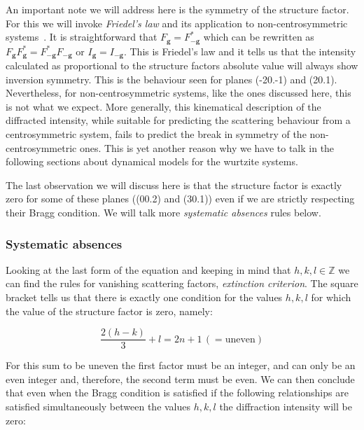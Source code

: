 An important note we will address here is the symmetry of the structure factor. For this we will invoke \textit{Friedel's law} and its application to non-centrosymmetric systems~\cite{Serneels73}. It is straightforward that $F_\mathbf{g}=F^*_{-\mathbf{g}}$ which can be rewritten as $F_\mathbf{g} F^*_\mathbf{g}=F^*_{-\mathbf{g}}F_{-\mathbf{g}}$ or $I_\mathbf{g}=I_\mathbf{-g}$. This is Friedel's law and it tells us that the intensity calculated as proportional to the structure factors absolute value will always show inversion symmetry. This is the behaviour seen for planes \hkl(-20.-1) and \hkl(20.1). Nevertheless, for non-centrosymmetric systems, like the ones discussed here, this is not what we expect. More generally, this kinematical description of the diffracted intensity, while suitable for predicting the scattering behaviour from a centrosymmetric system, fails to predict the break in symmetry of the non-centrosymmetric ones.  This is yet another reason why we have to talk in the following sections about dynamical models for the wurtzite systems. 


The last observation we will discuss here is that the structure factor is exactly zero for some of these planes (\hkl(00.2) and \hkl(30.1)) even if we are strictly respecting their Bragg condition. We will talk more \textit{systematic absences} rules below. 


\subsubsection{Systematic absences }

 Looking at the last form of the equation and keeping in mind that $h,k,l \in  \mathbb{Z}$ we can find the rules for vanishing scattering factors, \ie \emph{extinction criterion}. The square bracket tells us that there is exactly one condition for the values $h,k,l$ for which the value of the structure factor is zero, namely:
 
 \begin{equation*}
     \frac{2(h-k)}{3} + l  = 2n+1 \, ( = \text{uneven})
 \end{equation*}

For this sum to be uneven the first factor must be an integer, and can only be an even integer and, therefore, the second term must be even. We can then conclude that even when the Bragg condition is satisfied if the following relationships are satisfied simultaneously between the values $h, k, l$ the diffraction intensity will be zero:

